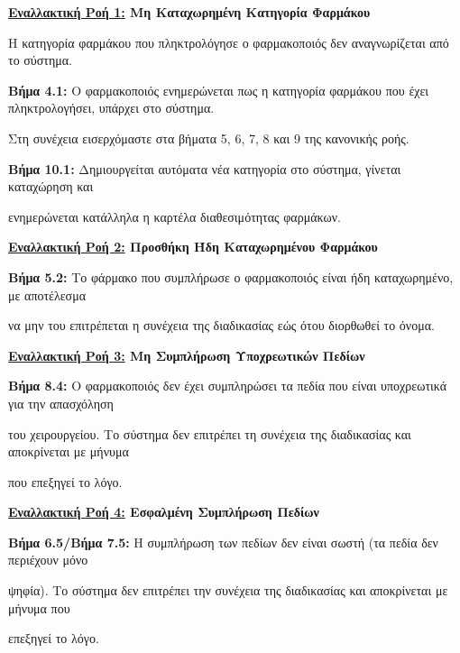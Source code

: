 \documentclass{article}
\begin{document}
  \textbf{\underline{Εναλλακτική Ροή 1:} Μη Καταχωρημένη Κατηγορία Φαρμάκου}  \vspace{0.1cm}
\par Η κατηγορία φαρμάκου που πληκτρολόγησε ο φαρμακοποιός δεν  αναγνωρίζεται από το σύστημα. \vspace{0.1cm}
\par \textbf{Βήμα 4.1:} Ο φαρμακοποιός ενημερώνεται πως η κατηγορία φαρμάκου που έχει πληκτρολογήσει,  υπάρχει στο σύστημα. \vspace{0.1cm}
\par Στη συνέχεια εισερχόμαστε στα βήματα 5, 6, 7, 8 και 9 της κανονικής ροής. \vspace{0.1cm}
\par \textbf{Βήμα 10.1:} Δημιουργείται αυτόματα νέα κατηγορία στο σύστημα, γίνεται καταχώρηση και \par ενημερώνεται κατάλληλα η καρτέλα διαθεσιμότητας φαρμάκων.

\vspace{0.2cm}
 
\textbf{\underline{Εναλλακτική Ροή 2:} Προσθήκη Ήδη Καταχωρημένου Φαρμάκου} \vspace{0.2cm} 
\par \textbf{Βήμα 5.2:} Το φάρμακο που συμπλήρωσε ο φαρμακοποιός είναι ήδη καταχωρημένο, με αποτέλεσμα \par να μην του επιτρέπεται η συνέχεια της διαδικασίας εώς ότου διορθωθεί το όνομα.\vspace{0.1cm}

\vspace{0.2cm}

\textbf{\underline{Εναλλακτική Ροή 3:} Μη Συμπλήρωση Υποχρεωτικών Πεδίων} \vspace{0.2cm} 
\par \textbf{Βήμα 8.4:} Ο φαρμακοποιός δεν έχει συμπληρώσει τα πεδία που είναι υποχρεωτικά για την απασχόληση \par του χειρουργείου. Το σύστημα δεν επιτρέπει τη συνέχεια της διαδικασίας και αποκρίνεται με μήνυμα \par που επεξηγεί το λόγο. \vspace{0.2cm}

\textbf{\underline{Εναλλακτική Ροή 4:} Εσφαλμένη Συμπλήρωση Πεδίων} \vspace{0.2cm} 
\par \textbf{Βήμα 6.5/Βήμα 7.5:} Η συμπλήρωση των πεδίων δεν είναι σωστή (τα πεδία δεν περιέχουν μόνο \par ψηφία). Το σύστημα δεν επιτρέπει την συνέχεια της διαδικασίας και αποκρίνεται με μήνυμα που \par επεξηγεί το λόγο.
\end{document}
